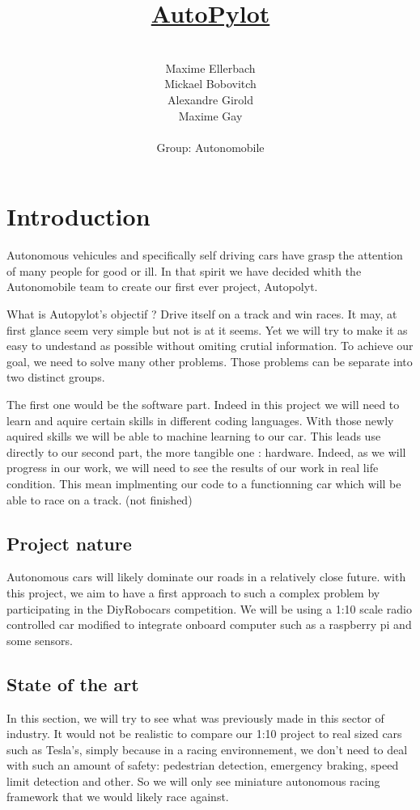 \documentclass[12pt]{article}
\title{\underline{AutoPylot}}
\date{}
\author{%
    \\
    Maxime Ellerbach \\
    Mickael Bobovitch \\
    Alexandre Girold \\
    Maxime Gay \\ \\
    Group: Autonomobile 
    }
\begin{document}
\maketitle
\newpage

\tableofcontents
\newpage

\section{Introduction}
Autonomous vehicules and specifically self driving cars have grasp the attention of many people for good or ill. In that spirit we have decided whith the Autonomobile team to create our first ever project, Autopolyt.

	What is Autopylot's objectif ? Drive itself on a track and win races. It may, at first glance seem very simple but not is at it seems. Yet we will try to make it as easy to undestand as possible without omiting crutial information. To achieve our goal, we need to solve many other problems. Those problems can be separate into two distinct groups. 
    
The first one would be the software part. Indeed in this project we will need to learn and aquire certain skills in different coding languages. With those newly aquired skills we will be able to machine learning to our car. This leads use directly to our second part, the more tangible one : hardware. Indeed, as we will progress in our work, we will need to see the results of our work in real life condition. This mean implmenting our code to a functionning car which will be able to race on a track. (not finished)

\subsection{Project nature}
Autonomous cars will likely dominate our roads in a relatively close future.
with this project, we aim to have a first approach to such a complex problem by participating in the DiyRobocars competition.
We will be using a 1:10 scale radio controlled car modified to integrate onboard computer such as a raspberry pi and some sensors.

\subsection{State of the art}
In this section, we will try to see what was previously made in this sector of industry.
It would not be realistic to compare our 1:10 project to real sized cars such as Tesla's, simply because in a racing environnement,
we don't need to deal with such an amount of safety: pedestrian detection, emergency braking, speed limit detection and other.
So we will only see miniature autonomous racing framework that we would likely race against.\\
\end{document}
